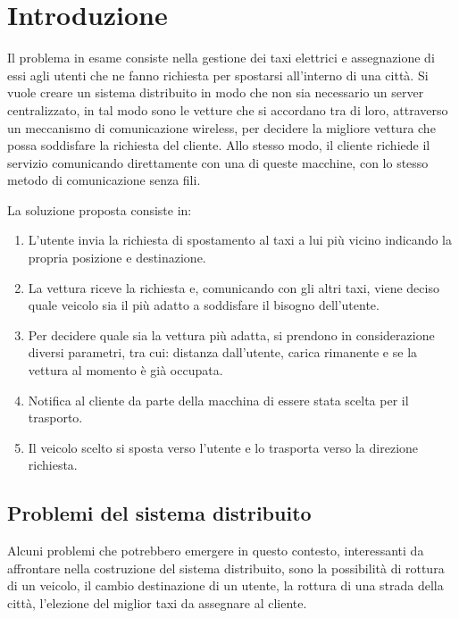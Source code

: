 
\chapter{Introduzione}

Il problema in esame consiste nella gestione dei taxi elettrici e assegnazione di essi agli utenti che ne fanno richiesta per spostarsi all'interno di una città. Si vuole creare un sistema distribuito in modo che non sia necessario un server centralizzato, in tal modo sono le vetture che si accordano tra di loro, attraverso un meccanismo di comunicazione wireless, per decidere la migliore vettura che possa soddisfare la richiesta del cliente. Allo stesso modo, il cliente richiede il servizio comunicando direttamente con una di queste macchine, con lo stesso metodo di comunicazione senza fili. 

La soluzione proposta consiste in:
\begin{enumerate}
	\item L'utente invia la richiesta di spostamento al taxi a lui più vicino indicando la propria posizione e destinazione.
	\item La vettura riceve la richiesta e, comunicando con gli altri taxi, viene deciso quale veicolo sia il più adatto a soddisfare il bisogno dell'utente.
	\item Per decidere quale sia la vettura più adatta, si prendono in considerazione diversi parametri, tra cui: distanza dall'utente, carica rimanente e se la vettura al momento è già occupata.
	\item Notifica al cliente da parte della macchina di essere stata scelta per il trasporto.
	\item Il veicolo scelto si sposta verso l'utente e lo trasporta verso la direzione richiesta.
\end{enumerate}

\section{Problemi del sistema distribuito} \label{problematiche_distribuite}

Alcuni problemi che potrebbero emergere in questo contesto, interessanti da affrontare nella costruzione del sistema distribuito, sono la possibilità di rottura di un veicolo, il cambio destinazione di un utente, la rottura di una strada della città, l'elezione del miglior taxi da assegnare al cliente.

